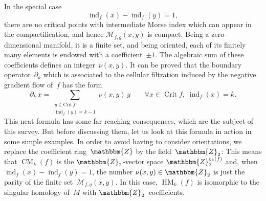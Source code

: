 \documentclass[12pt,twoside]{amsart}
\theoremstyle{plain}
\numberwithin{figure}{section}
\numberwithin{equation}{section}
\def\ind{\operatorname{ind}}
\def\Crit{\operatorname{Crit}}
\def\CM{\operatorname{CM}}
\def\HM{\operatorname{HM}}
\def\ZZ{\mathbbm{Z}}
\begin{document}
In the special case 
\[
\ind_f(x) - \ind_f(y)=1,
\]
there are no critical points with intermediate Morse index which can appear in the compactification, 
and hence $\mathcal{M}_{f,g}(x,y)$ is compact. Being a zero-dimensional manifold, it is a finite set, 
and being oriented, each of its finitely many elements is endowed with a coefficient~$\pm 1$. 
The algebraic sum of these coefficients defines an integer~$\nu(x,y)$. It can be proved that 
the boundary operator~$\partial_k$ which is associated to the cellular filtration induced by the negative gradient flow of~$f$ has the form
\begin{equation}
\label{bdry}
\partial_k \, x = \sum_{\substack{y\in \mathrm{Crit}\, f \\ \ind_f(y)=k-1}} \nu(x,y)\, y \qquad \forall x\in \Crit f, \; \ind_f(x)=k.
\end{equation}
This neat formula has some far reaching consequences, which are the subject of this survey. 
But before discussing them, let us look at this formula in action in some simple examples. 
In order to avoid having to consider orientations, we replace the coefficient ring~$\ZZ$ 
by the field~$\ZZ_2$:
This means that $\CM_k(f)$ is the $\ZZ_2$-vector space $\ZZ_2^{c_k(f)}$ and, when $\ind_f(x)-\ind_f(y)=1$, 
the number $\nu(x,y) \in \ZZ_2$ is just the parity of the finite set~$\mathcal{M}_{f,g}(x,y)$. 
In this case, $\HM_k(f)$ is isomorphic to the singular homology of~$M$ with $\ZZ_2$~coefficients.
\end{document}

